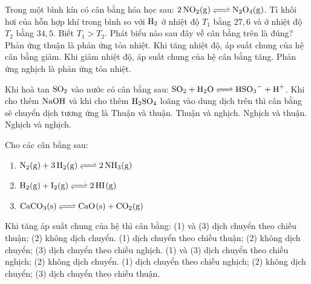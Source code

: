 \documentclass[12pt,a4paper]{article}
\begin{document}
\begin{ex}
Trong một bình kín có cân bằng hóa học sau: $\ce{2NO2(g) <=> N2O4(g)}$. Tỉ khối hơi của hỗn hợp khí trong bình so với $\ce{H2}$ ở nhiệt độ $T_1$ bằng $27{,}6$ và ở nhiệt độ $T_2$ bằng $34{,}5$. Biết $T_1 > T_2$. Phát biểu nào sau đây về cân bằng trên là đúng?
\choice
{\True Phản ứng thuận là phản ứng tỏa nhiệt.}
{Khi tăng nhiệt độ, áp suất chung của hệ cân bằng giảm.}
{Khi giảm nhiệt độ, áp suất chung của hệ cân bằng tăng.}
{Phản ứng nghịch là phản ứng tỏa nhiệt.}
\end{ex}

\begin{ex}
Khi hoà tan $\ce{SO2}$ vào nước có cân bằng sau: $\ce{SO2 + H2O <=> HSO3- + H+}$. Khi cho thêm $\ce{NaOH}$ và khi cho thêm $\ce{H2SO4}$ loãng vào dung dịch trên thì cân bằng sẽ chuyển dịch tương ứng là
\choice
{Thuận và thuận.}
{\True Thuận và nghịch.}
{Nghịch và thuận.}
{Nghịch và nghịch.}
\end{ex}

\begin{ex}
Cho các cân bằng sau:
\begin{enumerate}[(1)]
	\item $\ce{N2(g) + 3H2(g) <=> 2NH3(g)}$
	\item $\ce{H2(g) + I2(g) <=> 2HI(g)}$
	\item $\ce{CaCO3(s) <=> CaO(s) + CO2(g)}$
\end{enumerate}
Khi tăng áp suất chung của hệ thì cân bằng:
\choice
{(1) và (3) dịch chuyển theo chiều thuận; (2) không dịch chuyển.}
{\True (1) dịch chuyển theo chiều thuận; (2) không dịch chuyển; (3) dịch chuyển theo chiều nghịch.}
{(1) và (3) dịch chuyển theo chiều nghịch; (2) không dịch chuyển.}
{(1) dịch chuyển theo chiều nghịch; (2) không dịch chuyển; (3) dịch chuyển theo chiều thuận.}
\end{ex}
\end{document}

